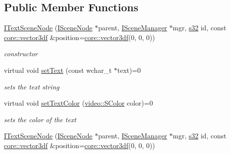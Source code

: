 \subsection*{Public Member Functions}
\begin{DoxyCompactItemize}
\item 
\mbox{\label{classirr_1_1scene_1_1ITextSceneNode_a097623c669cd0401693de8716565d73f}} 
\hyperlink{classirr_1_1scene_1_1ITextSceneNode_a097623c669cd0401693de8716565d73f}{I\+Text\+Scene\+Node} (\hyperlink{classirr_1_1scene_1_1ISceneNode}{I\+Scene\+Node} $\ast$parent, \hyperlink{classirr_1_1scene_1_1ISceneManager}{I\+Scene\+Manager} $\ast$mgr, \hyperlink{namespaceirr_ac66849b7a6ed16e30ebede579f9b47c6}{s32} id, const \hyperlink{namespaceirr_1_1core_ae6e2b2a6c552833ebbd5b7463d03586b}{core\+::vector3df} \&position=\hyperlink{namespaceirr_1_1core_ae6e2b2a6c552833ebbd5b7463d03586b}{core\+::vector3df}(0, 0, 0))
\begin{DoxyCompactList}\small\item\em constructor \end{DoxyCompactList}\item 
\mbox{\label{classirr_1_1scene_1_1ITextSceneNode_a398822c1a3ca68bbd171ab1534d69aa2}} 
virtual void \hyperlink{classirr_1_1scene_1_1ITextSceneNode_a398822c1a3ca68bbd171ab1534d69aa2}{set\+Text} (const wchar\+\_\+t $\ast$text)=0
\begin{DoxyCompactList}\small\item\em sets the text string \end{DoxyCompactList}\item 
\mbox{\label{classirr_1_1scene_1_1ITextSceneNode_af1d914bc036c54e060b1673e922083dd}} 
virtual void \hyperlink{classirr_1_1scene_1_1ITextSceneNode_af1d914bc036c54e060b1673e922083dd}{set\+Text\+Color} (\hyperlink{classirr_1_1video_1_1SColor}{video\+::\+S\+Color} color)=0
\begin{DoxyCompactList}\small\item\em sets the color of the text \end{DoxyCompactList}\item 
\mbox{\label{classirr_1_1scene_1_1ITextSceneNode_a097623c669cd0401693de8716565d73f}} 
\hyperlink{classirr_1_1scene_1_1ITextSceneNode_a097623c669cd0401693de8716565d73f}{I\+Text\+Scene\+Node} (\hyperlink{classirr_1_1scene_1_1ISceneNode}{I\+Scene\+Node} $\ast$parent, \hyperlink{classirr_1_1scene_1_1ISceneManager}{I\+Scene\+Manager} $\ast$mgr, \hyperlink{namespaceirr_ac66849b7a6ed16e30ebede579f9b47c6}{s32} id, const \hyperlink{namespaceirr_1_1core_ae6e2b2a6c552833ebbd5b7463d03586b}{core\+::vector3df} \&position=\hyperlink{namespaceirr_1_1core_ae6e2b2a6c552833ebbd5b7463d03586b}{core\+::vector3df}(0, 0, 0))

\end{DoxyCompactItemize}
